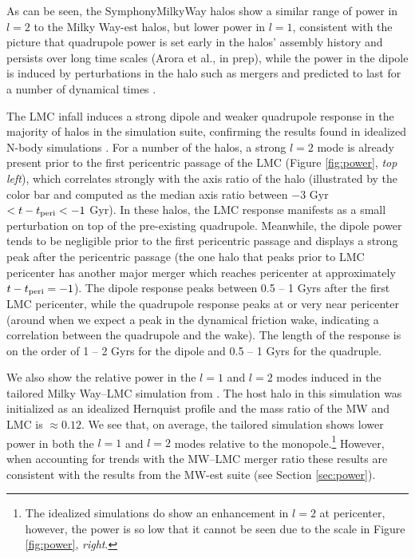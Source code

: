 \documentclass[twocolumn, linenumbers]{openjournal}
\begin{document}
As can be seen, the SymphonyMilkyWay halos show a similar range of
power in $l=2$ to the Milky Way-est halos, but lower power in $l=1$, consistent 
with the picture that quadrupole power is set early in the halos' assembly history
and persists over long time scales (Arora et al., in prep), while the power in 
the dipole is induced by perturbations in the halo such as mergers and predicted 
to last for a number of dynamical times \citep{Weinberg_23}. 



The LMC infall induces a strong dipole and weaker 
quadrupole response in the majority of halos in the simulation suite, confirming the results found in idealized N-body simulations \citep[e.g,][]{Petersen_20, Garavito_Camargo_2021, Lilleengen_23}.
For a number of the halos, a strong $l=2$ mode is already present prior to the first pericentric passage of the LMC (Figure \ref{fig:power}, \emph{top left}), which correlates strongly with the axis ratio of the halo (illustrated by the color bar and computed as the median axis ratio between $-3$ Gyr $< t-t_{\rm peri} < -1$ Gyr). 
In these halos, the LMC response manifests as a small perturbation on top of the pre-existing quadrupole. Meanwhile, the dipole power tends to be negligible prior to the first 
pericentric passage and displays a strong peak after the pericentric passage (the one halo that peaks prior to LMC pericenter has another major merger which reaches pericenter 
at approximately $t-t_{\rm peri} = -1$). The dipole response peaks between 0.5 -- 1 Gyrs after the first LMC pericenter, while the quadrupole response peaks at or very near 
pericenter (around when we expect a peak in the dynamical friction wake, indicating a correlation between the quadrupole and the wake). The length of the response is on the order of 1 -- 2 Gyrs for the dipole and 0.5 -- 1 Gyrs for the quadruple.


We also show the relative power in the $l=1$ and $l=2$ modes induced in the tailored Milky Way--LMC simulation from \cite{garavito_19} \citep{Garavito_Camargo_2021}. The host 
halo in this simulation was initialized as an idealized Hernquist profile and the mass ratio of the MW and LMC is $\approx 0.12$. We see that, on average, the tailored simulation 
shows lower power in both the $l=1$ and $l=2$ modes relative to the monopole.\footnote{The idealized simulations do show an enhancement in $l=2$ at pericenter, however, the power is so low that it cannot be seen due to the scale in Figure \ref{fig:power}, \emph{right}.} However, when accounting for trends with the MW--LMC merger ratio these results are consistent with the results from the MW-est suite (see Section \ref{sec:power}).
\end{document}
